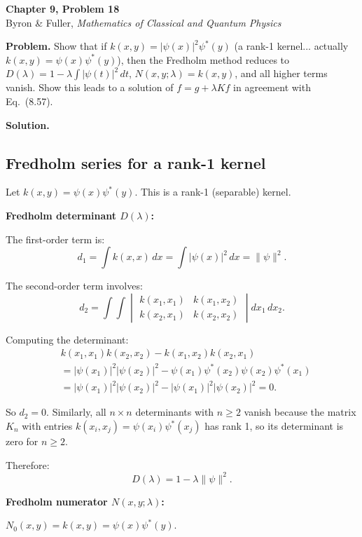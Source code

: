 \documentclass[12pt]{article}
\begin{document}
\begin{center}
{\Large\bfseries Chapter 9, Problem 18}\\[6pt]
Byron \& Fuller, \textit{Mathematics of Classical and Quantum Physics}
\end{center}

\bigskip

\textbf{Problem.} Show that if $k(x,y) = |\psi(x)|^2\psi^*(y)$ (a rank-1 kernel... actually $k(x,y) = \psi(x)\psi^*(y)$), then the Fredholm method reduces to $D(\lambda) = 1 - \lambda\int |\psi(t)|^2\,dt$, $N(x,y;\lambda) = k(x,y)$, and all higher terms vanish. Show this leads to a solution of $f = g + \lambda Kf$ in agreement with Eq.~(8.57).

\bigskip
\textbf{Solution.}

\subsection*{Fredholm series for a rank-1 kernel}

Let $k(x,y) = \psi(x)\psi^*(y)$. This is a rank-1 (separable) kernel.

\textbf{Fredholm determinant $D(\lambda)$:}

The first-order term is:
\[
d_1 = \int k(x,x)\,dx = \int |\psi(x)|^2\,dx = \|\psi\|^2.
\]

The second-order term involves:
\[
d_2 = \int\!\!\int \begin{vmatrix} k(x_1,x_1) & k(x_1,x_2) \\ k(x_2,x_1) & k(x_2,x_2) \end{vmatrix} dx_1\,dx_2.
\]

Computing the determinant:
\begin{align}
&k(x_1,x_1)k(x_2,x_2) - k(x_1,x_2)k(x_2,x_1) \\
&= |\psi(x_1)|^2|\psi(x_2)|^2 - \psi(x_1)\psi^*(x_2)\psi(x_2)\psi^*(x_1) \\
&= |\psi(x_1)|^2|\psi(x_2)|^2 - |\psi(x_1)|^2|\psi(x_2)|^2 = 0.
\end{align}

So $d_2 = 0$. Similarly, all $n \times n$ determinants with $n \ge 2$ vanish because the matrix $K_n$ with entries $k(x_i, x_j) = \psi(x_i)\psi^*(x_j)$ has rank 1, so its determinant is zero for $n \ge 2$.

Therefore:
\[
\boxed{D(\lambda) = 1 - \lambda\|\psi\|^2}.
\]

\textbf{Fredholm numerator $N(x,y;\lambda)$:}

$N_0(x,y) = k(x,y) = \psi(x)\psi^*(y)$.
\end{document}
